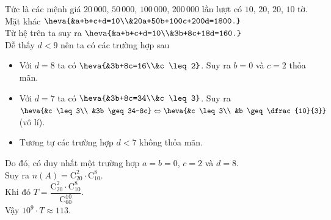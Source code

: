 \begin{ex}
{		Tức là các mệnh giá $20\,000$, $50\,000$, $100\,000$, $200\,000$ lần lượt có $10$, $20$, $20$, $10$ tờ.\\
		Mặt khác $\heva{&a+b+c+d=10\\&20a+50b+100c+200d=1800.}$\\
		Từ hệ trên ta suy ra $\heva{&a+b+c+d=10\\&3b+8c+18d=160.}$\\
		Dễ thấy $d<9$ nên ta có các trường hợp sau
		\begin{itemize}
			\item Với $d=8$ ta có $\heva{&3b+8c=16\\&c \leq 2}$. Suy ra $b=0$ và $c=2$ thỏa mãn.
			\item Với $d=7$ ta có $\heva{&3b+8c=34\\&c \leq 3}$. Suy ra $\heva{&c \leq 3\\ &3b \geq 34-8c} \Leftrightarrow \heva{&c \leq 3\\ &b \geq \dfrac{10}{3}}$ (vô lí).
			\item Tương tự các trường hợp $d<7$ không thỏa mãn.
		\end{itemize}
		Do đó, có duy nhất một trường hợp $a=b=0$, $c=2$ và $d=8$.\\
		Suy ra $n(A)=\mathrm{C}_{20}^2 \cdot \mathrm{C}_{10}^8$.\\
		Khi đó $T=\dfrac{\mathrm{C}_{20}^2 \cdot \mathrm{C}_{10}^8}{\mathrm{C}_{60}^{10}}$.\\
		Vậy $10^9\cdot T \approx 113$.
	}
\end{ex}

